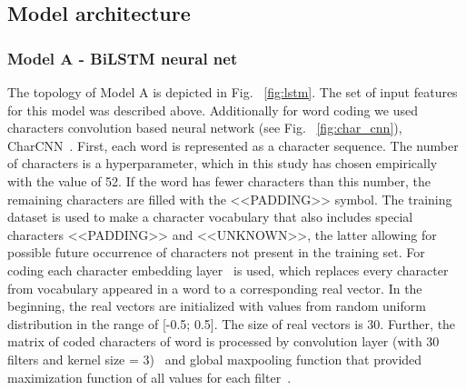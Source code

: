 \documentclass[a4paper,fleqn,longmktitle]{cas-dc}
\begin{document}
\subsection{Model architecture}%
\subsubsection{Model A - BiLSTM neural net}
The topology of Model A is depicted in Fig. ~\ref{fig:lstm}. The set of input features for this model was described above.
Additionally for word coding we used characters convolution based neural network (see Fig. ~\ref{fig:char_cnn}), CharCNN~\cite{krizhevsky2012imagenet}.
First, each word is represented as a character sequence. The number of characters is a hyperparameter, which in this study has chosen empirically with the value of 52. If the word has fewer characters than this number, the remaining characters are filled with the <<PADDING>> symbol. The training dataset is used to make a character vocabulary that also includes special characters <<PADDING>> and <<UNKNOWN>>, the latter allowing for possible future occurrence of characters not present in the training set.
For coding each character embedding layer~\cite{gal2016theoretically} is used, which replaces every character from vocabulary appeared in a word to a corresponding real vector. In the beginning, the real vectors are initialized with values from random uniform distribution in the range of [-0.5; 0.5]. The size of real vectors is 30. Further, the matrix of coded characters of word is processed by convolution layer (with 30 filters and kernel size = 3)~\cite{dumoulin2016guide} and global maxpooling function that provided maximization function of all values for each filter~\cite{boureau2010theoretical}.
\end{document}
